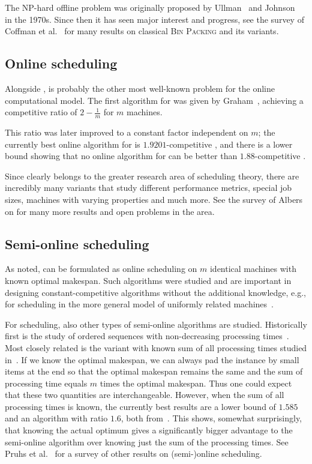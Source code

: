The NP-hard offline problem \binpacking was originally proposed by
Ullman~\cite{ullman71} and Johnson~\cite{johnson73} in the
1970s. Since then it has seen major interest and progress, see the
survey of Coffman et al.~\cite{coffman13} for many results on
classical \textsc{Bin Packing} and its variants. 

\subsection{Online scheduling}\label{sec:1:schedulinghistory}

Alongside \binpacking, \scheduling is probably the other most
well-known problem for the online computational model. The first
algorithm for \scheduling was given by Graham~\cite{Graham66},
achieving a competitive ratio of $2-\frac{1}{m}$ for $m$ machines.

This ratio was later improved to a constant factor independent on $m$;
the currently best online algorithm for \scheduling is
$1.9201$-competitive \cite{}, and there is a lower bound showing that
no online algorithm for \scheduling can be better than
$1.88$-competitive \cite{}.

Since \scheduling clearly belongs to the greater research area of
scheduling theory, there are incredibly many variants that study
different performance metrics, special job sizes, machines with
varying properties and much more. See the survey of Albers
\cite{alberssurvey} on \scheduling for many more results and open
problems in the area.

\subsection{Semi-online scheduling}

As noted, \binstretch can be formulated as online scheduling on
$m$ identical machines with known optimal makespan. Such algorithms
were studied and are important in designing constant-competitive
algorithms without the additional knowledge, e.g., for scheduling in
the more general model of uniformly related
machines~\cite{AsAFPW97,BeChKa00,EbJaSg09}.

For scheduling, also other types of semi-online algorithms are
studied. Historically first is the study of ordered sequences with
non-decreasing processing times~\cite{Graham69}. Most closely related
is the variant with known sum of all processing times studied
in~\cite{KeKoST97}. If we know the optimal makespan, we can always pad
the instance by small items at the end so that the optimal makespan
remains the same and the sum of processing time equals $m$ times the
optimal makespan. Thus one could expect that these two quantities are
interchangeable. However, when the sum of all processing times is
known, the currently best results are a lower bound of $1.585$ and an
algorithm with ratio $1.6$, both
from~\cite{DBLP:journals/tcs/AlbersH12}. This shows, somewhat
surprisingly, that knowing the actual optimum gives a significantly
bigger advantage to the semi-online algorithm over knowing just the
sum of the processing times. See Pruhs et al.~\cite{PST04} for a
survey of other results on (semi-)online scheduling.

